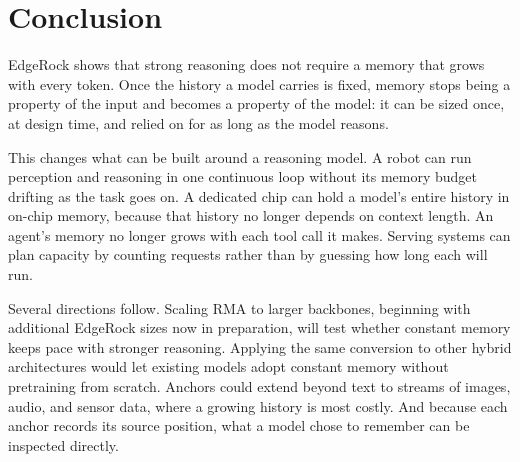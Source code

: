 \section{Conclusion}
\label{sec:conclusion}

EdgeRock shows that strong reasoning does not require a memory that grows with every token. Once the history a model carries is fixed, memory stops being a property of the input and becomes a property of the model: it can be sized once, at design time, and relied on for as long as the model reasons.

This changes what can be built around a reasoning model. A robot can run perception and reasoning in one continuous loop without its memory budget drifting as the task goes on. A dedicated chip can hold a model's entire history in on-chip memory, because that history no longer depends on context length. An agent's memory no longer grows with each tool call it makes. Serving systems can plan capacity by counting requests rather than by guessing how long each will run.

Several directions follow. Scaling RMA to larger backbones, beginning with additional EdgeRock sizes now in preparation, will test whether constant memory keeps pace with stronger reasoning. Applying the same conversion to other hybrid architectures would let existing models adopt constant memory without pretraining from scratch. Anchors could extend beyond text to streams of images, audio, and sensor data, where a growing history is most costly. And because each anchor records its source position, what a model chose to remember can be inspected directly.
